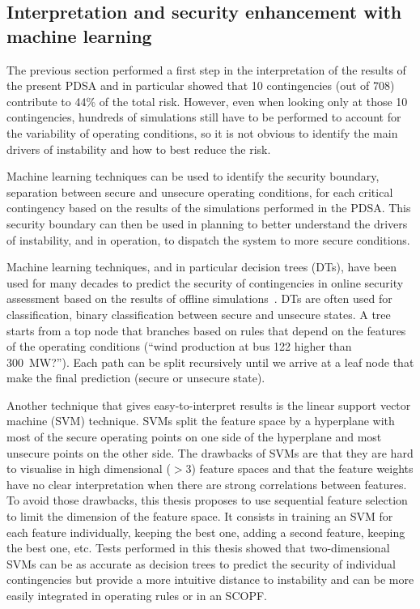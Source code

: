 \subsection{Interpretation and security enhancement with machine learning}
\label{sec:PDSA_ML}

The previous section performed a first step in the interpretation of the results of the present PDSA and in particular showed that 10 contingencies (out of 708) contribute to 44\% of the total risk. However, even when looking only at those 10 contingencies, hundreds of simulations still have to be performed to account for the variability of operating conditions, so it is not obvious to identify the main drivers of instability and how to best reduce the risk.


Machine learning techniques can be used to identify the security boundary, \ie separation between secure and unsecure operating conditions, for each critical contingency based on the results of the simulations performed in the PDSA. This security boundary can then be used in planning to better understand the drivers of instability, and in operation, to dispatch the system to more secure conditions.

Machine learning techniques, and in particular decision trees (DTs), have been used for many decades to predict the security of contingencies in online security assessment based on the results of offline simulations~\cite{DT_Wehenkel}. DTs are often used for classification, \eg binary classification between secure and unsecure states. A tree starts from a top node that branches based on rules that depend on the features of the operating conditions (\eg ``wind production at bus 122 higher than 300~MW?''). Each path can be split recursively until we arrive at a leaf node that make the final prediction (\eg secure or unsecure state).

Another technique that gives easy-to-interpret results is the linear support vector machine (SVM) technique. SVMs split the feature space by a hyperplane with most of the secure operating points on one side of the hyperplane and most unsecure points on the other side. The drawbacks of SVMs are that they are hard to visualise in high dimensional (\(>3\)) feature spaces and that the feature weights have no clear interpretation when there are strong correlations between features. To avoid those drawbacks, this thesis proposes to use sequential feature selection to limit the dimension of the feature space. It consists in training an SVM for each feature individually, keeping the best one, adding a second feature, keeping the best one, etc. Tests performed in this thesis showed that two-dimensional SVMs can be as accurate as decision trees to predict the security of individual contingencies but provide a more intuitive distance to instability and can be more easily integrated in operating rules or in an SCOPF.

